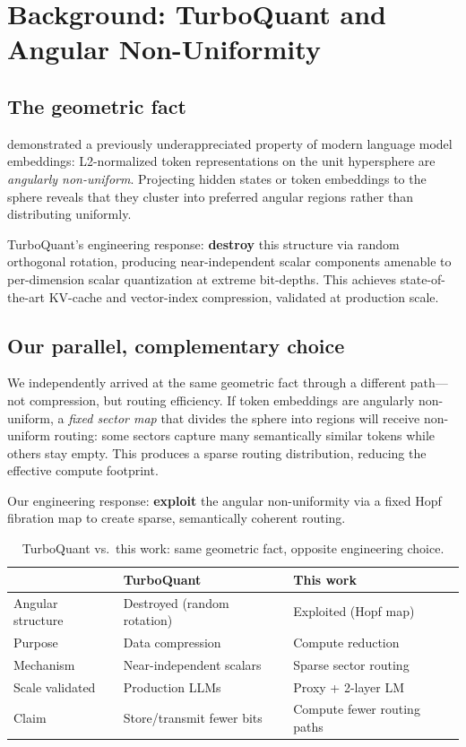 \documentclass[11pt]{article}
\begin{document}
\section{Background: TurboQuant and Angular Non-Uniformity}

\subsection{The geometric fact}

\citet{turboquant2026} demonstrated a previously underappreciated property of modern
language model embeddings: L2-normalized token representations on the unit hypersphere
are \emph{angularly non-uniform}.
Projecting hidden states or token embeddings to the sphere reveals that they cluster
into preferred angular regions rather than distributing uniformly.

TurboQuant's engineering response: \textbf{destroy} this structure via random orthogonal
rotation, producing near-independent scalar components amenable to per-dimension scalar
quantization at extreme bit-depths.
This achieves state-of-the-art KV-cache and vector-index compression, validated at
production scale.

\subsection{Our parallel, complementary choice}

We independently arrived at the same geometric fact through a different path---not
compression, but routing efficiency.
If token embeddings are angularly non-uniform, a \emph{fixed sector map} that divides
the sphere into regions will receive non-uniform routing: some sectors capture many
semantically similar tokens while others stay empty.
This produces a sparse routing distribution, reducing the effective compute footprint.

Our engineering response: \textbf{exploit} the angular non-uniformity via a fixed Hopf
fibration map to create sparse, semantically coherent routing.

\begin{table}[h]
\centering
\caption{TurboQuant vs.\ this work: same geometric fact, opposite engineering choice.}
\label{tab:comparison}
\begin{tabular}{lll}
\toprule
                    & \textbf{TurboQuant} & \textbf{This work} \\
\midrule
Angular structure   & Destroyed (random rotation)   & Exploited (Hopf map)          \\
Purpose             & Data compression              & Compute reduction             \\
Mechanism           & Near-independent scalars      & Sparse sector routing         \\
Scale validated     & Production LLMs               & Proxy + 2-layer LM            \\
Claim               & Store/transmit fewer bits     & Compute fewer routing paths   \\
\bottomrule
\end{tabular}
\end{table}
\end{document}
